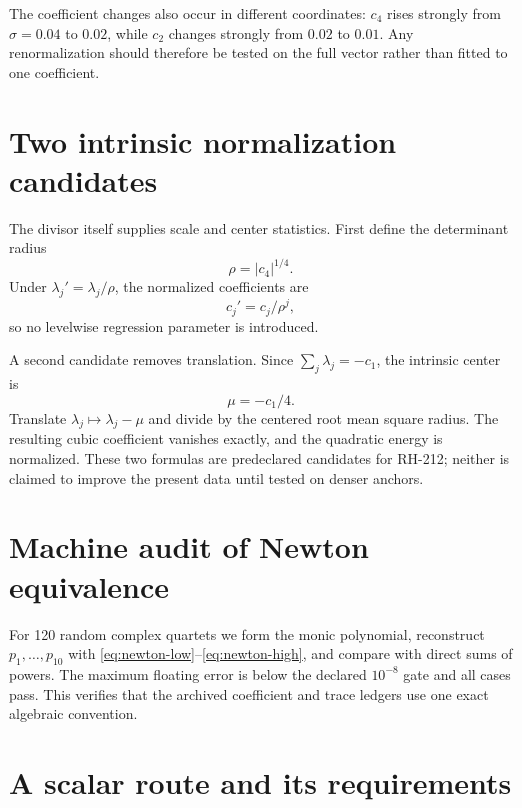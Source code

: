 \documentclass[12pt]{article}
\theoremstyle{remark}\newtheorem{remark}[theorem]{Remark}
\begin{document}
The coefficient changes also occur in different coordinates: $c_4$ rises
strongly from $\sigma=0.04$ to $0.02$, while $c_2$ changes strongly from
$0.02$ to $0.01$.  Any renormalization should therefore be tested on the
full vector rather than fitted to one coefficient.

\section{Two intrinsic normalization candidates}

The divisor itself supplies scale and center statistics.  First define the
determinant radius
\begin{equation}\label{eq:rho}
 \rho=|c_4|^{1/4}.
\end{equation}
Under $\lambda_j'=\lambda_j/\rho$, the normalized coefficients are
\begin{equation}\label{eq:radial-coeff}
 c_j'=c_j/\rho^j,
\end{equation}
so no levelwise regression parameter is introduced.

A second candidate removes translation.  Since
$\sum_j\lambda_j=-c_1$, the intrinsic center is
\begin{equation}\label{eq:center}
 \mu=-c_1/4.
\end{equation}
Translate $\lambda_j\mapsto\lambda_j-\mu$ and divide by the centered root
mean square radius.  The resulting cubic coefficient vanishes exactly, and
the quadratic energy is normalized.  These two formulas are predeclared
candidates for RH-212; neither is claimed to improve the present data until
tested on denser anchors.

\section{Machine audit of Newton equivalence}

For 120 random complex quartets we form the monic polynomial, reconstruct
$p_1,\ldots,p_{10}$ with \eqref{eq:newton-low}--\eqref{eq:newton-high}, and
compare with direct sums of powers.  The maximum floating error is below the
declared $10^{-8}$ gate and all cases pass.  This verifies that the archived
coefficient and trace ledgers use one exact algebraic convention.

\section{A scalar route and its requirements}
\end{document}
